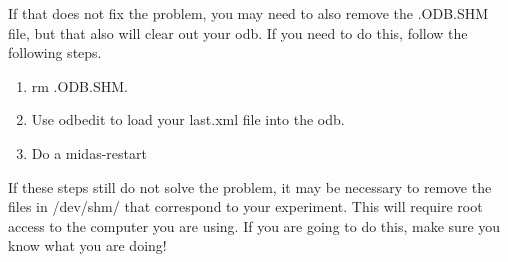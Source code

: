 If that does not fix the problem, you may need to also remove the .ODB.SHM file, but that also will clear out your odb. If you need to do this, follow the following steps.

\begin{enumerate}
\item rm .ODB.SHM.
\item Use odbedit to load your last.xml file into the odb.
\item Do a midas-restart
\end{enumerate}

If these steps still do not solve the problem, it may be necessary to remove the files in /dev/shm/ that correspond to your experiment. This will require root access to the computer you are using. If you are going to do this, make sure you know what you are doing!